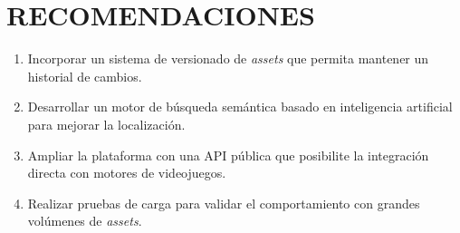 \suggestions

\chapter*{RECOMENDACIONES}

\begin{enumerate}
    \item Incorporar un sistema de versionado de \textit{assets} que permita mantener un historial de cambios.

    \item Desarrollar un motor de búsqueda semántica basado en inteligencia artificial para mejorar la localización.

    \item Ampliar la plataforma con una API pública que posibilite la integración directa con motores de videojuegos.

    \item Realizar pruebas de carga para validar el comportamiento con grandes volúmenes de \textit{assets}.
\end{enumerate}